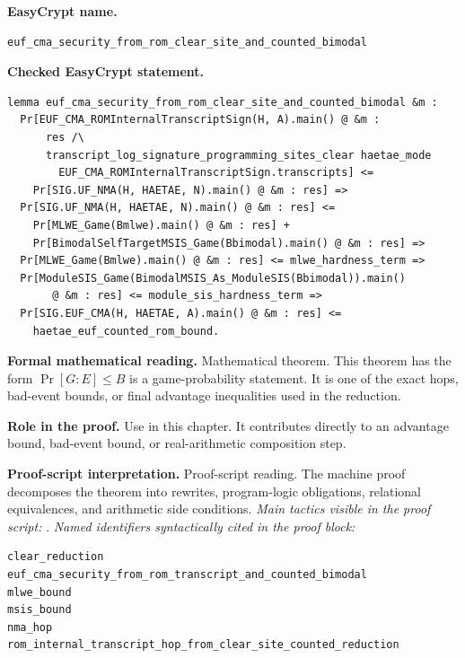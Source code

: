 \begin{formaltheorem}
\noindent\textbf{EasyCrypt name.}
\begin{lstlisting}[language=EasyCrypt,basicstyle=\ttfamily\scriptsize]
euf_cma_security_from_rom_clear_site_and_counted_bimodal
\end{lstlisting}
\noindent\textbf{Checked EasyCrypt statement.}
\begin{lstlisting}[language=EasyCrypt,basicstyle=\ttfamily\scriptsize]
lemma euf_cma_security_from_rom_clear_site_and_counted_bimodal &m :
  Pr[EUF_CMA_ROMInternalTranscriptSign(H, A).main() @ &m :
      res /\
      transcript_log_signature_programming_sites_clear haetae_mode
        EUF_CMA_ROMInternalTranscriptSign.transcripts] <=
    Pr[SIG.UF_NMA(H, HAETAE, N).main() @ &m : res] =>
  Pr[SIG.UF_NMA(H, HAETAE, N).main() @ &m : res] <=
    Pr[MLWE_Game(Bmlwe).main() @ &m : res] +
    Pr[BimodalSelfTargetMSIS_Game(Bbimodal).main() @ &m : res] =>
  Pr[MLWE_Game(Bmlwe).main() @ &m : res] <= mlwe_hardness_term =>
  Pr[ModuleSIS_Game(BimodalMSIS_As_ModuleSIS(Bbimodal)).main()
       @ &m : res] <= module_sis_hardness_term =>
  Pr[SIG.EUF_CMA(H, HAETAE, A).main() @ &m : res] <=
    haetae_euf_counted_rom_bound.
\end{lstlisting}
\noindent\textbf{Formal mathematical reading.}
Mathematical theorem. This theorem has the form \(\Pr[G:E] \le B\) is a game-probability statement.  It is one of the exact hops, bad-event bounds, or final advantage inequalities used in the reduction.

\noindent\textbf{Role in the proof.}
Use in this chapter. It contributes directly to an advantage bound, bad-event bound, or real-arithmetic composition step.

\noindent\textbf{Proof-script interpretation.}
Proof-script reading. The machine proof decomposes the theorem into rewrites, program-logic obligations, relational equivalences, and arithmetic side conditions.
\emph{Main tactics visible in the proof script:} \ec{apply}.
\emph{Named identifiers syntactically cited in the proof block:}
\begin{lstlisting}[language=EasyCrypt,basicstyle=\ttfamily\scriptsize]
clear_reduction
euf_cma_security_from_rom_transcript_and_counted_bimodal
mlwe_bound
msis_bound
nma_hop
rom_internal_transcript_hop_from_clear_site_counted_reduction
\end{lstlisting}

\end{formaltheorem}

